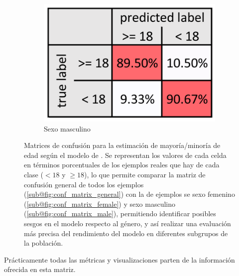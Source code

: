 \begin{itemize}
\begin{figure}[h]
\begin{subfigure}[b]{0.3\textwidth}
            \label{fig:conf_matrix_female}
        \end{subfigure}
        \hfill
        \begin{subfigure}[b]{0.3\textwidth}
            \centering
            \includegraphics[width=\textwidth]{capitulos/cap_02/imagenes/confusion_matrix_binary_3.png}
            \caption{Sexo masculino}
            \label{fig:conf_matrix_male}
        \end{subfigure}
    
        \caption[
            Matrices de confusión para la estimación de mayoría/minoría de edad según el modelo de 
            \cite{porto2020}.
        ]{
            Matrices de confusión para la estimación de mayoría/minoría de edad según el modelo de 
            \cite{porto2020}.
            Se representan los valores de cada celda en términos porcentuales de los ejemplos reales que hay 
            de cada clase ($< 18$ y $\ge 18$), lo que permite comparar la matriz de confusión general de todos 
            los ejemplos (\ref{sub@fig:conf_matrix_general}) con la de ejemplos se sexo femenino 
            (\ref{sub@fig:conf_matrix_female}) y sexo masculino (\ref{sub@fig:conf_matrix_male}), permitiendo 
            identificar posibles sesgos en el modelo respecto al género, y así realizar una evaluación más 
            precisa del rendimiento del modelo en diferentes subgrupos de la población.
        }
        \label{fig:conf_matrix_binary_relative}
    \end{figure}

    Prácticamente todas las métricas y visualizaciones parten de la información ofrecida en esta matriz. 
    


\end{itemize}
